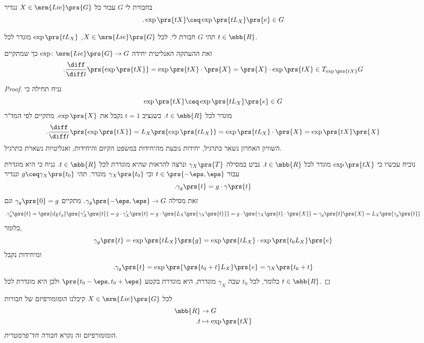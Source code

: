 \documentclass[10pt, twoside]{book}
\newcommand{\Lie}{\mrm{Lie}}
\begin{document}
\begin{definition}
בחבורת לי
$G$
עבור כל
$X \in \Lie\prs{G}$
נגדיר
\[\text{.} \exp\prs{tX} \ceq \exp\prs{t L_X}\prs{e} \in G\]
\end{definition}


\begin{theorem}
תהי
$G$
חבורת לי.
לכל
$X \in \Lie\prs{G}$,
$\exp\prs{t L_X}$
מוגדר לכל
$t \in \mbb{R}$.

זאת ההעתקה האנליטית יחידה
$\exp \colon \Lie\prs{G} \to G$
כך שמתקיים
\[\text{.} \frac{\diff}{\diff t} \prs{\exp \prs{tX}} = \exp\prs{tX} \cdot \prs{X} = \prs{X} \cdot \exp\prs{tX} \in T_{\exp\prs{tX}} G\]
\end{theorem}

\begin{proof}
נניח תחילה כי
\[\exp\prs{tX} \ceq \exp\prs{t L_X}\prs{e} \in G\]
מוגדר לכל
$t \in \mbb{R}$.
כשנציב
$t = 1$
נקבל את
$\exp\prs{X}$.
מתקיים לפי המד"ר
\[\text{.} \frac{\diff}{\diff t} \prs{\exp\prs{tX}} = L_X\prs{\exp\prs{t L_X}} = \exp\prs{t L_X} \cdot \prs{X} = \exp\prs{tX} \prs{X}\]
השוויון האחרון נשאר כתרגיל, יחידות נובעת מהיחידות במשפט הקיום והיחידות, ואנליטיות נשארת כתרגיל.

נוכיח עכשיו כי
$\exp\prs{tX}$
מוגדר לכל
$t \in \mbb{R}$.
נביט במסילה
$\gamma_X\prs{T}$
ונרצה להראות שהיא מוגדרת לכל
$t \in \mbb{R}$.
נניח כי היא מוגדרת עבור
$t \in \prs{-\eps, \eps}$
וכי
$\gamma_X\prs{t_0}$
מוגדר.
תהי
$g \ceq \gamma_X\prs{t_0}$
ונגדיר
\[\text{.}\gamma_g\prs{t} = g \cdot \gamma\prs{t}\]
זאת מסילה
$\gamma_g\prs{-\eps,\eps} \to G$.
מתקיים
$\gamma_g\prs{0} = g$
וגם
\[\text{.} \gamma_g'\prs{t} = \prs{d_E \ell_g} \prs{\gamma'_X\prs{t}} = g \cdot \gamma'_X\prs{t} = g \cdot \prs{L_X\prs{\gamma_X\prs{t}}} = g \cdot \prs{\gamma_X\prs{t} \cdot \prs{X}} = \gamma_g\prs{t} \prs{X} = L_X\prs{\gamma_g\prs{t}}\]
כלומר,
\[\gamma_g\prs{t} = \exp\prs{t L_X}\prs{g} = \exp\prs{t L_X} \cdot \exp\prs{t_0 L_X}\prs{e}\]
ומיחידות נקבל
\[\text{.} \gamma_g\prs{t} = \exp\prs{\prs{t_0 + t} L_X} \prs{e} = \gamma_X\prs{t_0 + t}\]
כלומר, לכל
$t_0$
שבה
$\gamma_X$
מוגדרת, היא מוגדרת בקטע
$\prs{t_0 - \eps, t_0 + \eps}$
ולכן היא מוגדרת לכל
$t \in \mbb{R}$.
\end{proof}

\begin{remark}
לכל
$X \in \Lie\prs{G}$
קיבלנו הומומורפיזם של חבורות
\begin{align*}
\mbb{R} &\to G \\
\text{.} t &\mapsto \exp\prs{tX}
\end{align*}
הומומורפיזם זה נקרא
\emph{חבורה חד־פרמטרית}.
\end{remark}
\end{document}
